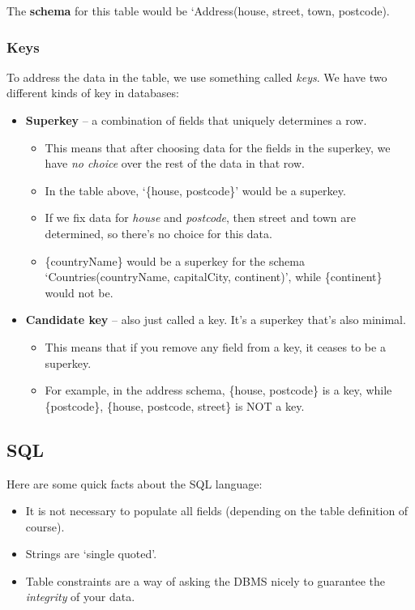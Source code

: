 \documentclass[11pt,a4paper,titlepage,dvipsnames,cmyk]{scrartcl}
\begin{document}
The \textbf{schema} for this table would be `Address(house, street, town,
postcode). 

\subsubsection{Keys}%
\label{ssub:Keys}

To address the data in the table, we use something called \textit{keys}.
We have two different kinds of key in databases:
\begin{itemize}
    \item \textbf{Superkey} -- a combination of fields that uniquely
        determines a row. 
        \begin{itemize}
            \item This  means that after choosing data for the
                fields in the superkey, we have \textit{no choice} over the rest
                of the data in that row.
            \item In the table above, `\{house, postcode\}' would be a
                superkey.
            \item If we fix data for \textit{house} and \textit{postcode},
                then street and town are determined, so there's no choice
                for this data.
            \item \{countryName\} would be a superkey for the schema
                `Countries(countryName, capitalCity, continent)', while
                \{continent\} would not be.
        \end{itemize}
    \item \textbf{Candidate key} -- also just called a key. It's a
        superkey that's also minimal.
        \begin{itemize}
            \item This means that if you remove any field from a key, it
                ceases to be a superkey.
            \item For example, in the address schema, \{house, postcode\}
                is a key, while \{postcode\}, \{house, postcode, street\}
                is NOT a key.
        \end{itemize}
\end{itemize}

\subsection{SQL}%
\label{sub:SQL}
Here are some quick facts about the SQL language:
\begin{itemize}
    \item It is not necessary to populate all fields (depending on the
        table definition of course).
    \item Strings are `single quoted'.
    \item Table constraints are a way of asking the DBMS nicely to
        guarantee the \textit{integrity} of your data.
\end{itemize}
\end{document}
